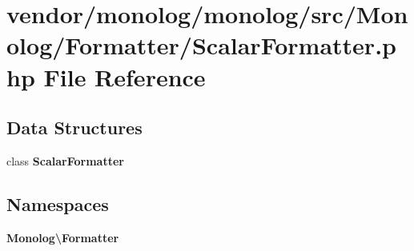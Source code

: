 \section{vendor/monolog/monolog/src/\+Monolog/\+Formatter/\+Scalar\+Formatter.php File Reference}
\label{_scalar_formatter_8php}
\subsection*{Data Structures}
\begin{DoxyCompactItemize}
\item 
class {\bf Scalar\+Formatter}
\end{DoxyCompactItemize}
\subsection*{Namespaces}
\begin{DoxyCompactItemize}
\item 
 {\bf Monolog\textbackslash{}\+Formatter}
\end{DoxyCompactItemize}
